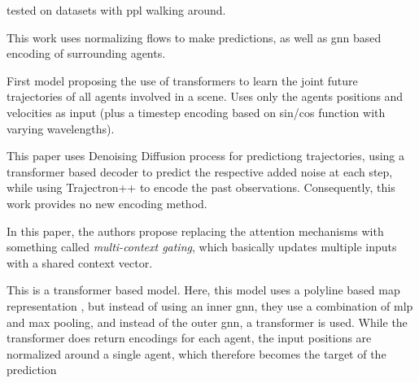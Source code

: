 tested on datasets with ppl walking around.

\cite{scholler2021flomo} This work uses normalizing flows to make predictions, as well as gnn based encoding of surrounding agents.


\cite{yuan2021agentformer} First model proposing the use of transformers to learn the joint future trajectories of all agents involved in a scene. Uses only the agents positions and velocities as input (plus a timestep encoding based on sin/cos function with varying wavelengths). 



\cite{navarro2022social}


\cite{gu2022stochastic} This paper uses Denoising Diffusion process for predictiong trajectories, using a transformer based decoder to predict the respective added noise at each step, while using Trajectron++ to encode the past observations. Consequently, this work provides no new encoding method.


\cite{varadarajan2022multipath} In this paper, the authors propose replacing the attention mechanisms with something called \textit{multi-context gating}, which basically updates multiple inputs with a shared context vector.


\cite{xu2022socialvae}



\cite{shi2022motion} This is a transformer based model. Here, this model uses a polyline based map representation \cite{gao2020vectornet}, but instead of using an inner gnn, they use a combination of mlp and max pooling, and instead of the outer gnn, a transformer is used. While the transformer does return encodings for each agent, the input positions are normalized around a single agent, which therefore becomes the target of the prediction


